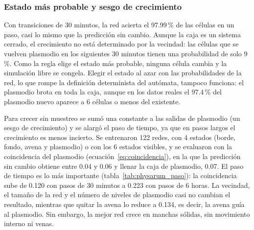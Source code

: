\subsubsection{Estado más probable y sesgo de crecimiento}
Con transiciones de 30 minutos, la red acierta el 97.99\,\% de las células en un paso, casi lo mismo que la predicción sin cambio. Aunque la caja es un sistema cerrado, el crecimiento no está determinado por la vecindad: las células que se vuelven plasmodio en los siguientes 30 minutos tienen una probabilidad de solo 9\,\%. Como la regla elige el estado más probable, ninguna célula cambia y la simulación libre se congela. Elegir el estado al azar con las probabilidades de la red, lo que rompe la definición determinista del autómata, tampoco funciona: el plasmodio brota en toda la caja, aunque en los datos reales el 97.4\,\% del plasmodio nuevo aparece a 6 células o menos del existente.

Para crecer sin muestreo se sumó una constante a las salidas de plasmodio (un sesgo de crecimiento) y se alargó el paso de tiempo, ya que en pasos largos el crecimiento es menos incierto. Se entrenaron 122 redes, con 4 estados (borde, fondo, avena y plasmodio) o con los 6 estados visibles, y se evaluaron con la coincidencia del plasmodio (ecuación~\ref{eq:coincidencia}), en la que la predicción sin cambio obtiene entre 0.04 y 0.06 y llenar la caja de plasmodio, 0.07. El paso de tiempo es lo más importante (tabla~\ref{tab:physarum_paso}): la coincidencia sube de 0.120 con pasos de 30 minutos a 0.223 con pasos de 6 horas. La vecindad, el tamaño de la red y el número de niveles de plasmodio casi no cambian el resultado, mientras que quitar la avena lo reduce a 0.134, es decir, la avena guía al plasmodio. Sin embargo, la mejor red crece en manchas sólidas, sin movimiento interno ni venas.

